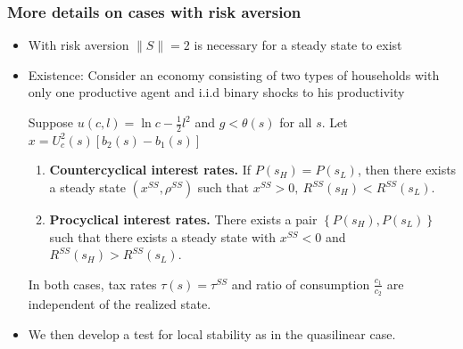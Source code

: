 \documentclass{beamer}
\begin{document}
\begin{frame}\label{risk aversion annex}
\frametitle{More details on cases with risk aversion}
\begin{itemize}
\item With risk aversion $\|S\|=2$ is  necessary for a steady state to exist
\item Existence: Consider an economy consisting of  two types of households with only one productive agent and i.i.d binary shocks to his productivity
\small
\begin{theorem}
\label{thm long run forces}Suppose $u(c,l)=\ln c-\frac{1}{2}%
l^{2}$ and $g<\theta (s)$ for all $%
s.$ Let $x=U^2_c(s)\left[b_2(s)-b_1(s)\right]$

\begin{enumerate}
\item \textbf{Countercyclical interest rates.} If $P \left( s_{H}\right) =P\left( s_{L}\right)$, then
there exists a steady state $\left( x^{SS},\rho ^{SS}\right) $ such that $%
x^{SS}>0,\ R^{SS}\left( s_{H}\right) <R^{SS}\left( s_{L}\right) .$
\item \textbf{Procyclical interest rates.} There exists a pair  $\left\{ P \left( s_{H}\right) ,P\left( s_{L}\right)
\right\} $ such that there exists a steady state with $x^{SS}<0$ and  $R^{SS}\left( s_{H}\right) >R^{SS}\left( s_{L}\right) .$
\end{enumerate}
In both cases, tax rates $\tau(s)=\tau^{SS}$ and ratio of consumption $\frac{c_1}{c_2}$ are independent of the realized state.
\end{theorem}
\item We then develop a test for local stability as in the quasilinear case. \hyperlink{risk aversion}{}

\end{itemize}

\end{frame}
\end{document}
